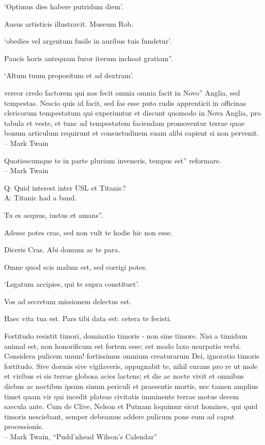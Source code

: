 \documentclass[titlepage,12pt]{memoir}
\begin{document}
‘Optimus dies habere putridum diem’.

Ausus artisticis illustravit. Museum Rob.

‘obedies vel argentum fusile in auribus tuis fundetur’.

Paucis horis antequam furor iterum inchoat gratiam”.

‘Altum tuum propositum et ad dextram’.

vereor credo factorem qui nos fecit omnia omnia facit in Novo”
Anglia, sed tempestas. Nescio quis id facit, sed fas esse puto
rudis apprenticii in officinas clericorum tempestatum qui experiuntur et discunt quomodo in
Nova Anglia, pro tabula et veste, et tunc ad tempestatem faciendam promoventur
terrae quae bonum articulum requirunt et consuetudinem suam alibi capient
si non pervenit.
\\-- Mark Twain

Quotiescumque te in parte plurium inveneris, tempus est”
reformare.
\\-- Mark Twain

Q: Quid interest inter USL et Titanic?\\
A: Titanic had a band.

Tu es aequus, iustus et amans”.

Adesse potes cras, sed non vult te hodie hic non esse.

Diceris Cras. Abi domum ac te para.

Omne quod scis malum est, sed corrigi potes.

‘Legatum accipies, qui te supra constituet’.

Vos ad secretum missionem delectus est.

Haec vita tua est. Pars tibi data est: cetera te fecisti.

Fortitudo resistit timori, dominatio timoris - non sine timore. Nisi a
timidum animal est, non honorificum est fortem esse; est modo
laxo usurpatio verbi. Considera pulicem unum!
fortissimus omnium creaturarum Dei, ignoratio timoris fortitudo.
Sive dormis sive vigilaveris, oppugnabit te, nihil curans pro re
ut mole et viribus ei sis terrae globosa acies
lactens; et die ac nocte vivit et omnibus diebus ac noctibus
ipsum sinum periculi et praesentis mortis, nec tamen amplius
timet quam vir qui incedit plateas civitatis imminente
terrae motus decem saecula ante. Cum de Clive, Nelson et Putnam loquimur
sicut homines, qui quid timoris nesciebant, semper debeamus addere pulicum
pone eum ad caput processionis.
\\-- Mark Twain, “Pudd’nhead Wilson’s Calendar”
\end{document}
